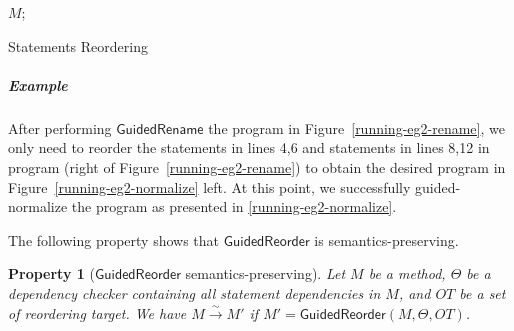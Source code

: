 \documentclass[a4paper, USenglish]{lipics-v2016}
\theoremstyle{plain}
\newtheorem{property}[theorem]{Property}
\begin{document}
\begin{algorithm}[ht]\footnotesize
{}
\Return $M$;
\caption{Statements Reordering}
\end{algorithm}

\subparagraph*{Example} After performing $\mathsf{GuidedRename}$ the program in Figure~\ref{running-eg2-rename}, we only need to reorder the statements in lines 4,6 and statements in lines 8,12 in program (right of Figure~\ref{running-eg2-rename}) to obtain the desired program in Figure~\ref{running-eg2-normalize} left. At this point, we successfully guided-normalize the program as presented in \ref{running-eg2-normalize}.

The following property shows that $\mathsf{GuidedReorder}$ is semantics-preserving.
\begin{property}[$\mathsf{GuidedReorder}$ semantics-preserving] 
  \label{property:guidedreordersafe}
  Let $M$ be a method, $\Theta$ be a dependency checker containing all
  statement dependencies in $M$, and $\mathit{OT}$ be a set of
  reordering target. We have $M\xrightarrow{\sim}M'$ if $M'=\mathsf{GuidedReorder}(M, \Theta, \mathit{OT})$. 
\end{property}
\end{document}
